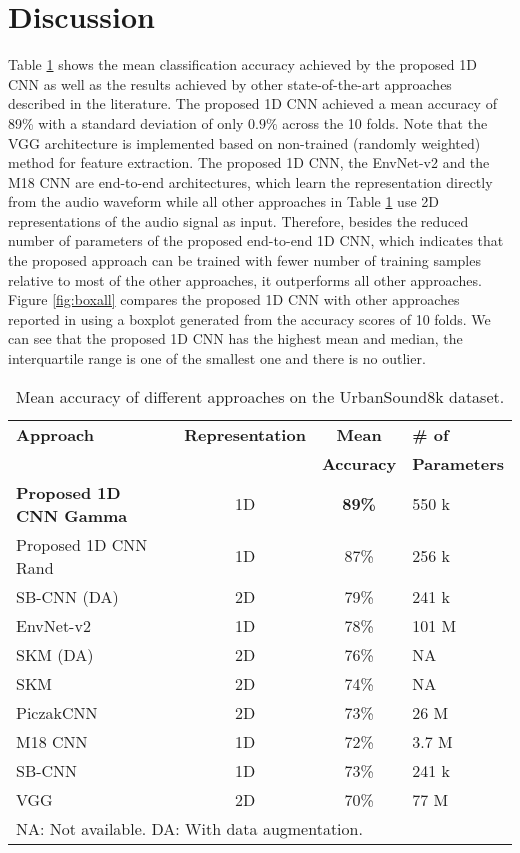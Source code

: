 \documentclass[preprint,final,12pt]{elsarticle}
\begin{document}
\section{Discussion}
\label{sec:dis}


Table \ref{table:meanacc} shows the mean classification accuracy achieved by the proposed 1D CNN as well as the results achieved by other state-of-the-art approaches described in the literature. The proposed 1D CNN achieved a mean accuracy of 89\% with a standard deviation of only $0.9\%$ across the 10 folds. Note that the VGG architecture \citep{pons2018randomly} is implemented based on non-trained (randomly weighted) method for feature extraction. The proposed 1D CNN, the EnvNet-v2 \citep{tokozume2017learning} and the M18 CNN \citep{Dai2017} are end-to-end architectures, which learn the representation directly from the audio waveform while all other approaches in Table \ref{table:meanacc} use 2D representations of the audio signal as input. Therefore, besides the reduced number of parameters of the proposed end-to-end 1D CNN, which indicates that the proposed approach can be trained with fewer number of training samples relative to most of the other approaches, it outperforms all other approaches. Figure \ref{fig:boxall} compares the proposed 1D CNN with other approaches reported in \citep{salamon2015unsupervised} using a boxplot generated from the accuracy scores of 10 folds. We can see that the proposed 1D CNN has the highest mean and median, the interquartile range is one of the smallest one and there is no outlier. 

\begin{table}[htpb!]
\caption{Mean accuracy of different approaches on the UrbanSound8k dataset.} \centering \footnotesize
\begin{tabular}{l c c l} \hline\hline \textbf{Approach}& \textbf{Representation} & \textbf{Mean} &\textbf{\# of} \\
 &  & \textbf{Accuracy} &\textbf{Parameters} \\
\hline \textbf{Proposed 1D CNN Gamma}& 1D &\textbf{89\%} & 550 k \\
Proposed 1D CNN Rand & 1D & 87\% & 256 k \\
SB-CNN (DA) \citep{2017deepsalamon}& 2D & 79\% & 241 k\\ EnvNet-v2 \citep{tokozume2017learning}&1D &78\% & 101 M\\
SKM (DA) \citep{salamon2015unsupervised}&2D &76\% & NA\\ SKM \citep{salamon2015unsupervised}&2D &74\% & NA\\
PiczakCNN \citep{piczak2015environmental}&2D &73\% & 26 M\\ M18 CNN \citep{Dai2017}&1D &72\% & 3.7 M\\ SB-CNN \citep{2017deepsalamon}&1D &73\% & 241 k\\
VGG \citep{pons2018randomly}&2D &70\% & 77 M\\ \hline \multicolumn{3}{l}{NA: Not available. DA: With data augmentation.}
\end{tabular}
\label{table:meanacc} \end{table}
\end{document}
